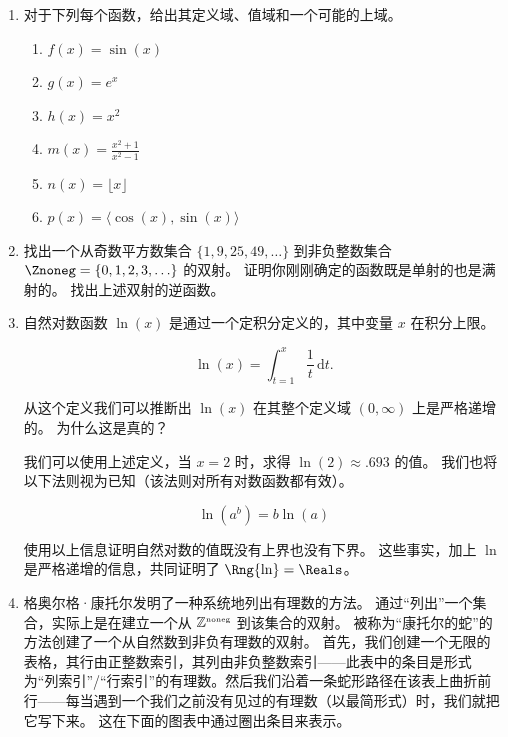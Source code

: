 \begin{enumerate}

  \item 对于下列每个函数，给出其定义域、值域和一个可能的上域。
  
  \begin{enumerate}
    \item \wbitemsep $f(x) = \sin{(x)}$
    \item \wbitemsep $g(x) = e^x$
    \item \wbitemsep $h(x) = x^2$
    \item \wbitemsep $m(x) = \frac{x^2+1}{x^2-1}$
    \item \wbitemsep $n(x) = \lfloor x \rfloor$
    \item \wbitemsep $p(x) = \langle \cos{(x)}, \sin{(x)} \rangle $
    \end{enumerate}
  
  \item 找出一个从奇数平方数集合 $\{1, 9, 25, 49, \ldots\}$ 到非负整数集合 $\Znoneg = \{0,1,2,3, \ldots\}$ 的双射。
  证明你刚刚确定的函数既是单射的也是满射的。
  找出上述双射的逆函数。
  
  \wbvfill
  
  \workbookpagebreak
  
  \item 自然对数函数 $\ln (x)$ 是通过一个定积分定义的，其中变量 $x$ 在积分上限。
  
  \[ \ln (x) = \int_{t=1}^{x} \frac{1}{t} \, \mbox{d}t. \]
  
  从这个定义我们可以推断出 $\ln (x)$ 在其整个定义域 $(0, \infty)$ 上是严格递增的。
  为什么这是真的？
  
  我们可以使用上述定义，当 $x=2$ 时，求得 $\ln (2) \approx .693$ 的值。
  我们也将以下法则视为已知（该法则对所有对数函数都有效）。
  
  \[ \ln(a^b) = b \ln(a) \]
  
  使用以上信息证明自然对数的值既没有上界也没有下界。
  这些事实，加上 $\ln$ 是严格递增的信息，共同证明了 $\Rng{\ln} = \Reals$。
  
  \wbvfill
  
  \workbookpagebreak
  
  \item 格奥尔格·康托尔发明了一种系统地列出有理数的方法。
  通过“列出”一个集合，实际上是在建立一个从 ${\mathbb Z}^{\mbox{\tiny noneg}}$ 到该集合的双射。
  被称为“康托尔的蛇”的方法创建了一个从自然数到非负有理数的双射。
  首先，我们创建一个无限的表格，其行由正整数索引，其列由非负整数索引——此表中的条目是形式为“列索引”/“行索引”的有理数。然后我们沿着一条蛇形路径在该表上曲折前行——每当遇到一个我们之前没有见过的有理数（以最简形式）时，我们就把它写下来。
  这在下面的图表中通过圈出条目来表示。
  

\end{enumerate}
